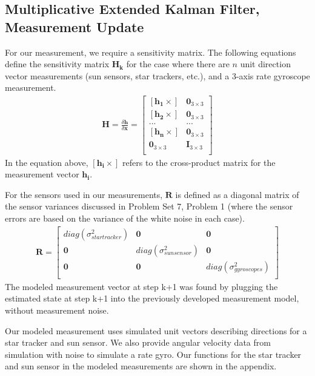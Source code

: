 \subsection{Multiplicative Extended Kalman Filter, Measurement Update}
For our measurement, we require a sensitivity matrix. The following equations define the sensitivity matrix $\mathbf{H_k}$ for the case where there are $n$ unit direction vector measurements (sun sensors, star trackers, etc.), and a 3-axis rate gyroscope measurement.
\begin{align*}
    \mathbf{H} = \frac{\delta \mathbf{h}}{\delta \mathbf{x}} =
    \begin{bmatrix}
        [\mathbf{h_1} \times] & \mathbf{0}_{3 \times 3} \\
        [\mathbf{h_2} \times] & \mathbf{0}_{3 \times 3} \\
        ... & ... \\
        [\mathbf{h_n} \times] & \mathbf{0}_{3 \times 3} \\
        \mathbf{0}_{3 \times 3} & \mathbf{I}_{3 \times 3} \\
    \end{bmatrix}
\end{align*}
In the equation above, $[\mathbf{h_i} \times]$ refers to the cross-product matrix for the measurement vector $\mathbf{h_i}$.

For the sensors used in our measurements, $\mathbf{R}$ is defined as a diagonal matrix of the sensor variances discussed in Problem Set 7, Problem 1 (where the sensor errors are based on the variance of the white noise in each case).
\begin{align*}
    \mathbf{R} = 
    \begin{bmatrix}
        diag(\sigma_{star tracker}^2) & \mathbf{0} & \mathbf{0} \\
        \mathbf{0} & diag(\sigma_{sun sensor}^2) & \mathbf{0} \\
        \mathbf{0} & \mathbf{0} & diag(\sigma_{gyroscopes}^2)\\
    \end{bmatrix}
\end{align*}
The modeled measurement vector at step k+1 was found by plugging the estimated state at step k+1 into the previously developed measurement model, without measurement noise.

Our modeled measurement uses simulated unit vectors describing directions for a star tracker and sun sensor. We also provide angular velocity data from simulation with noise to simulate a rate gyro. Our functions for the star tracker and sun sensor in the modeled measurements are shown in the appendix.

